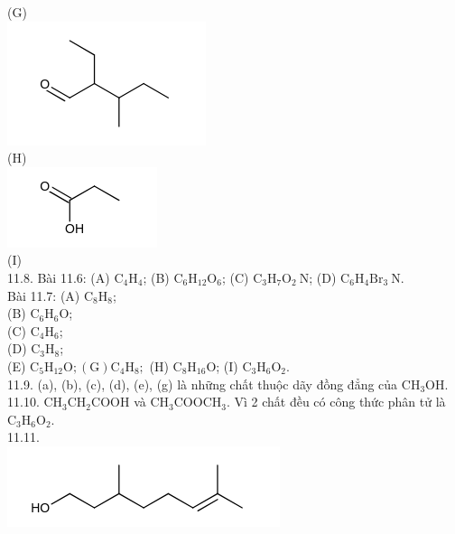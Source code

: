 \documentclass[10pt]{article}
\begin{document}
(G)\\
\includegraphics{smile-22ea30964e8bf9756091af8f77e7fb0c298d0b96}\\
(H)\\
\includegraphics{smile-89e9294cfa4d3f3a56e515c80a45e3c5952c0a00}\\
(I)\\
11.8. Bài 11.6: (A) $\mathrm{C}_{4} \mathrm{H}_{4}$; (B) $\mathrm{C}_{6} \mathrm{H}_{12} \mathrm{O}_{6}$; (C) $\mathrm{C}_{3} \mathrm{H}_{7} \mathrm{O}_{2} \mathrm{~N}$; (D) $\mathrm{C}_{6} \mathrm{H}_{4} \mathrm{Br}_{3} \mathrm{~N}$.\\
Bài 11.7: (A) $\mathrm{C}_{8} \mathrm{H}_{8}$;\\
(B) $\mathrm{C}_{6} \mathrm{H}_{6} \mathrm{O}$;\\
(C) $\mathrm{C}_{4} \mathrm{H}_{6}$;\\
(D) $\mathrm{C}_{3} \mathrm{H}_{8}$;\\
(E) $\mathrm{C}_{5} \mathrm{H}_{12} \mathrm{O} ;(\mathrm{G}) \mathrm{C}_{4} \mathrm{H}_{8} ;$ (H) $\mathrm{C}_{8} \mathrm{H}_{16} \mathrm{O}$; (I) $\mathrm{C}_{3} \mathrm{H}_{6} \mathrm{O}_{2}$.\\
11.9. (a), (b), (c), (d), (e), (g) là những chất thuộc dãy đồng đẳng của $\mathrm{CH}_{3} \mathrm{OH}$.\\
11.10. $\mathrm{CH}_{3} \mathrm{CH}_{2} \mathrm{COOH}$ và $\mathrm{CH}_{3} \mathrm{COOCH}_{3}$. Vì 2 chất đều có công thức phân tử là $\mathrm{C}_{3} \mathrm{H}_{6} \mathrm{O}_{2}$.\\
11.11.\\
\includegraphics{smile-2d9f54d35a28631be43d8155f8b18cbad0ef85fc}
\end{document}
